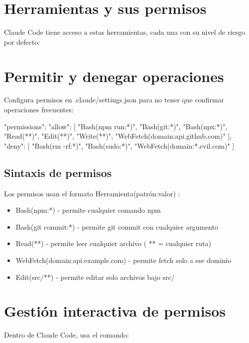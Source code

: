 \documentclass[11pt,a4paper]{book}
\begin{document}
\section{Herramientas y sus permisos}
Claude Code tiene acceso a estas herramientas, cada una con su nivel de riesgo por defecto:

\section{Permitir y denegar operaciones}
Configura permisos en .claude/settings.json para no tener que confirmar operaciones frecuentes:

\begin{codebox}
{
  "permissions": {
    "allow": [
      "Bash(npm run:*)",
      "Bash(git:*)",
      "Bash(npx:*)",
      "Read(**)",
      "Edit(**)",
      "Write(**)",
      "WebFetch(domain:api.github.com)"
    ],
    "deny": [
      "Bash(rm -rf:*)",
      "Bash(sudo:*)",
      "WebFetch(domain:*.evil.com)"
    ]
  }
}
\end{codebox}
\subsection{Sintaxis de permisos}
Los permisos usan el formato Herramienta(patrón:valor) :

\begin{itemize}\item Bash(npm:*) - permite cualquier comando npm\end{itemize}
\begin{itemize}\item Bash(git commit:*) - permite git commit con cualquier argumento\end{itemize}
\begin{itemize}\item Read(**) - permite leer cualquier archivo ( ** = cualquier ruta)\end{itemize}
\begin{itemize}\item WebFetch(domain:api.example.com) - permite fetch solo a ese dominio\end{itemize}
\begin{itemize}\item Edit(src/**) - permite editar solo archivos bajo src/\end{itemize}
\section{Gestión interactiva de permisos}
Dentro de Claude Code, usa el comando:
\end{document}
